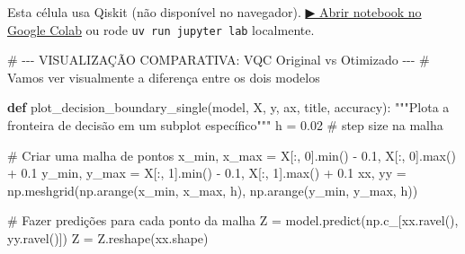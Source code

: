 \documentclass[
  brazilian,
]{report}
\newenvironment{Shaded}{\begin{snugshade}}{\end{snugshade}}
\newcommand{\BuiltInTok}[1]{\textcolor[rgb]{0.00,0.23,0.31}{#1}}
\newcommand{\CommentTok}[1]{\textcolor[rgb]{0.37,0.37,0.37}{#1}}
\newcommand{\DecValTok}[1]{\textcolor[rgb]{0.68,0.00,0.00}{#1}}
\newcommand{\FloatTok}[1]{\textcolor[rgb]{0.68,0.00,0.00}{#1}}
\newcommand{\KeywordTok}[1]{\textcolor[rgb]{0.00,0.23,0.31}{\textbf{#1}}}
\newcommand{\NormalTok}[1]{\textcolor[rgb]{0.00,0.23,0.31}{#1}}
\newcommand{\OperatorTok}[1]{\textcolor[rgb]{0.37,0.37,0.37}{#1}}
\begin{document}
\begin{tcolorbox}[enhanced jigsaw, arc=.35mm, bottomrule=.15mm, bottomtitle=1mm, breakable, colback=white, colbacktitle=quarto-callout-warning-color!10!white, colframe=quarto-callout-warning-color-frame, coltitle=black, left=2mm, leftrule=.75mm, opacityback=0, opacitybacktitle=0.6, rightrule=.15mm, title=\textcolor{quarto-callout-warning-color}{\faExclamationTriangle}\hspace{0.5em}{⚛️ Célula Qiskit --- execute no Colab ou localmente}, titlerule=0mm, toprule=.15mm, toptitle=1mm]

Esta célula usa Qiskit (não disponível no navegador).
\href{https://colab.research.google.com/github/maxwellamaral/aula-quantum/blob/main/notebooks/20-quantum-machine-learning.ipynb}{▶
Abrir notebook no Google Colab} ou rode \texttt{uv\ run\ jupyter\ lab}
localmente.

\begin{Shaded}
\begin{Highlighting}[]

\CommentTok{\# {-}{-}{-} VISUALIZAÇÃO COMPARATIVA: VQC Original vs Otimizado {-}{-}{-}}
\CommentTok{\# Vamos ver visualmente a diferença entre os dois modelos}

\KeywordTok{def}\NormalTok{ plot\_decision\_boundary\_single(model, X, y, ax, title, accuracy):}
    \CommentTok{"""Plota a fronteira de decisão em um subplot específico"""}
\NormalTok{    h }\OperatorTok{=} \FloatTok{0.02}  \CommentTok{\# step size na malha}
    
    \CommentTok{\# Criar uma malha de pontos}
\NormalTok{    x\_min, x\_max }\OperatorTok{=}\NormalTok{ X[:, }\DecValTok{0}\NormalTok{].}\BuiltInTok{min}\NormalTok{() }\OperatorTok{{-}} \FloatTok{0.1}\NormalTok{, X[:, }\DecValTok{0}\NormalTok{].}\BuiltInTok{max}\NormalTok{() }\OperatorTok{+} \FloatTok{0.1}
\NormalTok{    y\_min, y\_max }\OperatorTok{=}\NormalTok{ X[:, }\DecValTok{1}\NormalTok{].}\BuiltInTok{min}\NormalTok{() }\OperatorTok{{-}} \FloatTok{0.1}\NormalTok{, X[:, }\DecValTok{1}\NormalTok{].}\BuiltInTok{max}\NormalTok{() }\OperatorTok{+} \FloatTok{0.1}
\NormalTok{    xx, yy }\OperatorTok{=}\NormalTok{ np.meshgrid(np.arange(x\_min, x\_max, h),}
\NormalTok{                         np.arange(y\_min, y\_max, h))}
    
    \CommentTok{\# Fazer predições para cada ponto da malha}
\NormalTok{    Z }\OperatorTok{=}\NormalTok{ model.predict(np.c\_[xx.ravel(), yy.ravel()])}
\NormalTok{    Z }\OperatorTok{=}\NormalTok{ Z.reshape(xx.shape)}
    

\end{Highlighting}
\end{Shaded}
\end{tcolorbox}
\end{document}
